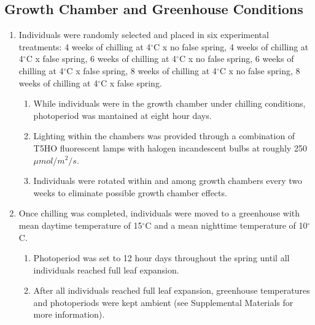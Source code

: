 \documentclass{article}\usepackage[]{graphicx}\usepackage[]{color}
\begin{document}
\subsection*{Growth Chamber and Greenhouse Conditions}
\begin{enumerate}
\item Individuals were randomly selected and placed in six experimental treatments: 4 weeks of chilling at 4$^{\circ}$C x no false spring, 4 weeks of chilling at 4$^{\circ}$C x false spring, 6 weeks of chilling at 4$^{\circ}$C x no false spring, 6 weeks of chilling at 4$^{\circ}$C x false spring,
8 weeks of chilling at 4$^{\circ}$C x no false spring, 8 weeks of chilling at 4$^{\circ}$C x false spring.
  \begin{enumerate}
  \item While individuals were in the growth chamber under chilling conditions, photoperiod was mantained at eight hour days.
  \item Lighting within the chambers was provided through a combination of T5HO fluorescent lamps with halogen incandescent bulbs at roughly 250 $\mu mol/m^{2}/s$.
  \item Individuals were rotated within and among growth chambers every two weeks to eliminate possible growth chamber effects.
  \end{enumerate}
\item Once chilling was completed, individuals were moved to a greenhouse with mean daytime temperature of 15$^{\circ}$C and a mean nighttime temperature of 10$^{\circ}$C.
  \begin{enumerate}
  \item Photoperiod was set to 12 hour days throughout the spring until all individuals reached full leaf expansion.
  \item After all individuals reached full leaf expansion, greenhouse temperatures and photoperiods were kept ambient (see Supplemental Materials for more information). 
  \end{enumerate}
\end{enumerate}
\end{document}
